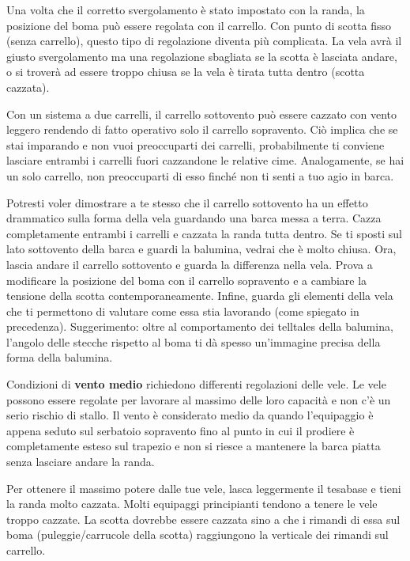 Una volta che il corretto svergolamento è stato impostato con la randa, la
posizione del boma può essere regolata con il carrello. Con punto di scotta
fisso (senza carrello), questo tipo di regolazione diventa più complicata. La
vela avrà il giusto svergolamento
ma una regolazione sbagliata se la scotta è lasciata andare, o si troverà ad
essere troppo chiusa se la vela è tirata tutta dentro (scotta cazzata).

Con un sistema a due carrelli, il carrello sottovento può essere cazzato con
vento leggero rendendo di fatto operativo solo il carrello sopravento. Ciò
implica che se stai imparando e non vuoi preoccuparti dei carrelli,
probabilmente ti conviene lasciare entrambi i carrelli fuori cazzandone le
relative cime.
Analogamente, se hai un solo carrello, non preoccuparti di esso finché non ti
senti a tuo agio in barca.

Potresti voler dimostrare a te stesso che il carrello sottovento ha un effetto
drammatico sulla forma della vela guardando una barca messa a terra. Cazza completamente
entrambi i carrelli e cazzata la randa tutta dentro. Se ti sposti sul lato
sottovento della barca e guardi la balumina, vedrai che è molto chiusa.
Ora, lascia andare il carrello sottovento e guarda la differenza nella vela.
Prova a modificare la posizione del boma con il carrello sopravento e a cambiare
la tensione della scotta contemporaneamente. Infine, guarda gli elementi della
vela che ti permettono di valutare come essa stia lavorando (come spiegato in
precedenza). Suggerimento: oltre al
comportamento dei telltales della balumina, l'angolo delle stecche rispetto al
boma ti dà spesso un'immagine precisa della forma della balumina.

Condizioni di \textbf{vento medio} richiedono differenti regolazioni delle vele. Le vele
possono essere regolate per lavorare al massimo delle loro capacità e non c'è un
serio rischio di stallo. Il vento è considerato medio da quando
l'equipaggio è appena seduto sul serbatoio sopravento fino al punto in cui il
prodiere è completamente esteso sul trapezio e non si riesce a mantenere la
barca piatta senza lasciare andare la randa.

Per ottenere il massimo potere dalle tue vele, lasca leggermente il tesabase e
tieni la randa molto cazzata. Molti
equipaggi principianti tendono a tenere le vele troppo cazzate. La scotta
dovrebbe essere cazzata sino a che i rimandi di essa
sul boma (puleggie/carrucole della scotta) raggiungono la
verticale dei rimandi sul carrello.

